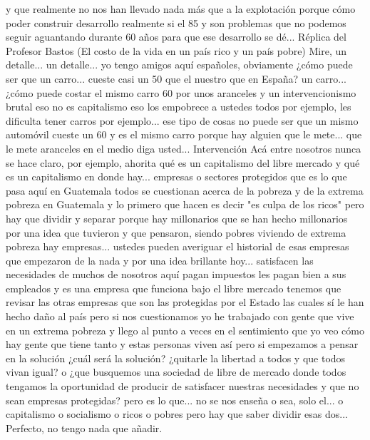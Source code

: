 y que realmente no nos han llevado nada más que a la explotación porque cómo poder construir desarrollo realmente si
el 85%
y son problemas que no podemos seguir aguantando durante 60 años para que ese desarrollo se dé...
Réplica del Profesor Bastos (El costo de la vida en un país rico y un país pobre)
Mire, un detalle... un detalle... yo tengo amigos aquí españoles, obviamente
¿cómo puede ser que un carro... cueste casi un 50%
que el nuestro que en España? un carro... ¿cómo puede costar el mismo carro
60%
por unos aranceles y un intervencionismo brutal eso no es capitalismo eso los empobrece a ustedes todos por ejemplo, les dificulta tener carros
por ejemplo... ese tipo de cosas no puede ser que un mismo automóvil cueste un 60%
y es el mismo carro porque hay alguien que le mete... que le mete aranceles en el medio diga usted...
Intervención
Acá entre nosotros nunca se hace claro, por ejemplo, ahorita qué es un capitalismo del libre mercado
y qué es un capitalismo en donde hay... empresas o sectores protegidos que es lo que pasa aquí en Guatemala
todos se cuestionan acerca de la pobreza y de la extrema pobreza en Guatemala y lo primero que hacen es decir
"es culpa de los ricos" pero hay que dividir y separar porque hay millonarios
que se han hecho millonarios por una idea que tuvieron y que pensaron, siendo pobres
viviendo de extrema pobreza hay empresas... ustedes pueden averiguar el historial de esas empresas
que empezaron de la nada y por una idea brillante hoy... satisfacen las necesidades
de muchos de nosotros aquí pagan impuestos les pagan bien a sus empleados
y es una empresa que funciona bajo el libre mercado tenemos que revisar las otras empresas
que son las protegidas por el Estado las cuales sí le han hecho daño al país pero si nos cuestionamos
yo he trabajado con gente que vive en un extrema pobreza y llego al punto a veces en el sentimiento que yo veo
cómo hay gente que tiene tanto y estas personas viven así pero si empezamos a pensar en la solución
¿cuál será la solución? ¿quitarle la libertad a todos y que todos vivan igual?
o ¿que busquemos una sociedad de libre de mercado donde todos tengamos la oportunidad de producir
de satisfacer nuestras necesidades y que no sean empresas protegidas? pero es lo que... no se nos enseña
o sea, solo el... o capitalismo o socialismo o ricos o pobres pero hay que saber dividir esas dos...
Perfecto, no tengo nada que añadir.